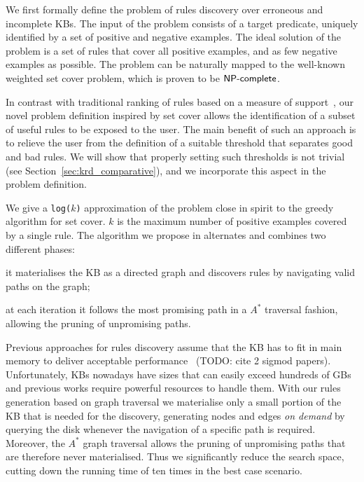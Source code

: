 We first formally define the problem of rules discovery over erroneous and incomplete KBs. The input of the problem consists of a target predicate, uniquely identified by a set of positive and negative examples. The ideal solution of the problem is a set of rules that cover all positive examples, and as few negative examples as possible. The problem can be naturally mapped to the well-known weighted set cover problem, which is proven to be $\textsf{NP\mbox{-}complete}$.  

In contrast with traditional ranking of rules based on a measure of support~\cite{dehaspe1999discovery,galarraga2015fast,muggleton1995inverse,schoenmackers2010learning}, our novel problem definition inspired by set cover allows the identification of a subset of useful rules to be exposed to the user. The main benefit of such an approach is to relieve the user from the definition of a suitable threshold that separates good and bad rules. We will show that properly setting such thresholds is not trivial (see Section~\ref{sec:krd_comparative}), and we incorporate this aspect in the problem definition.


 We give a \texttt{log($k$)} approximation of the problem close in spirit to the greedy algorithm for set cover. $k$ is the maximum number of positive examples covered by a single rule. The algorithm we propose in \krd alternates and combines two different phases:
\begin{inparaenum}[\itshape(i)]
	\item it materialises the KB as a directed graph and discovers rules by navigating valid paths on the graph;
	\item at each iteration it follows the most promising path in a $A^*$ traversal fashion, allowing the pruning of unpromising paths.	
\end{inparaenum}

Previous approaches for rules discovery assume that the KB has to fit in main memory to deliver acceptable performance~\cite{abedjan2014amending,galarraga2015fast} (TODO: cite 2 sigmod papers). Unfortunately, KBs nowadays have sizes that can easily exceed hundreds of GBs and previous works require powerful resources to handle them. With our rules generation based on graph traversal we materialise only a small portion of the KB that is needed for the discovery, generating nodes and edges \emph{on demand} by querying the disk whenever the navigation of a specific path is required. Moreover, the $A^*$ graph traversal allows the pruning of unpromising paths that are therefore never materialised. Thus we significantly reduce the search space, cutting down the running time of ten times in the best case scenario. 

